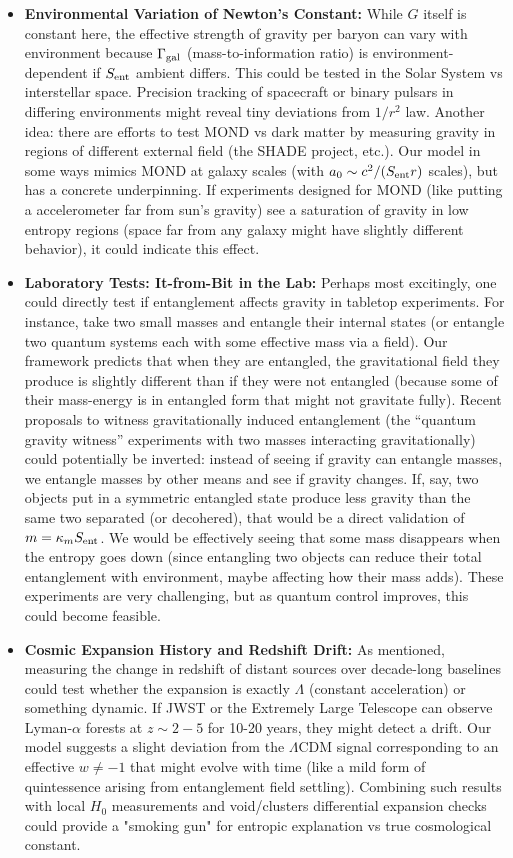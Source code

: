 \documentclass[11pt]{article}
\begin{document}
\begin{itemize}
    \item \textbf{Environmental Variation of Newton’s Constant:} While $G$ itself is constant here, the effective strength of gravity per baryon can vary with environment because $\Gamma_{\rm gal}$ (mass-to-information ratio) is environment-dependent if $S_{\rm ent}$ ambient differs​. This could be tested in the Solar System vs interstellar space. Precision tracking of spacecraft or binary pulsars in differing environments might reveal tiny deviations from $1/r^2$ law. Another idea: there are efforts to test MOND vs dark matter by measuring gravity in regions of different external field (the SHADE project, etc.)​. Our model in some ways mimics MOND at galaxy scales (with $a_0 \sim c^2/(S_{\rm ent} r)$ scales), but has a concrete underpinning. If experiments designed for MOND (like putting a accelerometer far from sun’s gravity) see a saturation of gravity in low entropy regions (space far from any galaxy might have slightly different behavior), it could indicate this effect​.

    \item \textbf{Laboratory Tests: It-from-Bit in the Lab:} Perhaps most excitingly, one could directly test if entanglement affects gravity in tabletop experiments. For instance, take two small masses and entangle their internal states (or entangle two quantum systems each with some effective mass via a field)​. Our framework predicts that when they are entangled, the gravitational field they produce is slightly different than if they were not entangled (because some of their mass-energy is in entangled form that might not gravitate fully). Recent proposals to witness gravitationally induced entanglement (the “quantum gravity witness” experiments with two masses interacting gravitationally) could potentially be inverted: instead of seeing if gravity can entangle masses, we entangle masses by other means and see if gravity changes​. If, say, two objects put in a symmetric entangled state produce less gravity than the same two separated (or decohered), that would be a direct validation of $m = \kappa_m S_{\rm ent}$. We would be effectively seeing that some mass disappears when the entropy goes down (since entangling two objects can reduce their total entanglement with environment, maybe affecting how their mass adds). These experiments are very challenging, but as quantum control improves, this could become feasible.

    \item \textbf{Cosmic Expansion History and Redshift Drift:} As mentioned, measuring the change in redshift of distant sources over decade-long baselines could test whether the expansion is exactly $\Lambda$ (constant acceleration) or something dynamic​. If JWST or the Extremely Large Telescope can observe Lyman-$\alpha$ forests at $z\sim2-5$ for 10-20 years, they might detect a drift. Our model suggests a slight deviation from the $\Lambda$CDM signal​ corresponding to an effective $w\neq -1$ that might evolve with time (like a mild form of quintessence arising from entanglement field settling). Combining such results with local $H_0$ measurements and void/clusters differential expansion checks could provide a "smoking gun" for entropic explanation vs true cosmological constant​.


\end{itemize}
\end{document}
